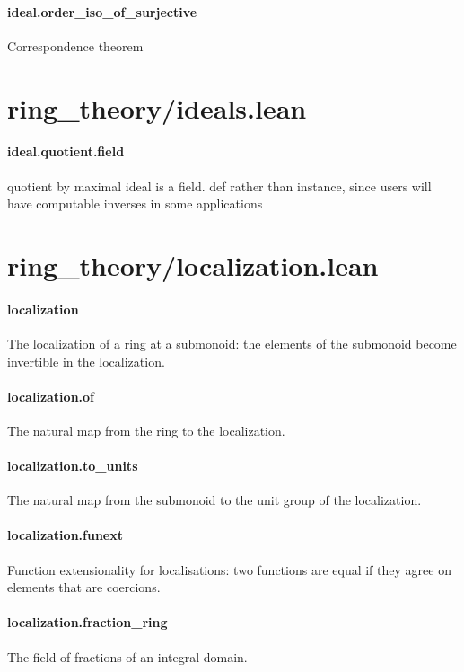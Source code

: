 \documentclass{article}
\begin{document}
\paragraph{ideal.order\_iso\_of\_surjective}
\par
Correspondence theorem
\section{ring\_theory/ideals.lean}\paragraph{ideal.quotient.field}
\par
quotient by maximal ideal is a field. def rather than instance, since users will have
computable inverses in some applications
\section{ring\_theory/localization.lean}\paragraph{localization}
\par
The localization of a ring at a submonoid:
the elements of the submonoid become invertible in the localization.
\paragraph{localization.of}
\par
The natural map from the ring to the localization.
\paragraph{localization.to\_units}
\par
The natural map from the submonoid to the unit group of the localization.
\paragraph{localization.funext}
\par
Function extensionality for localisations:
two functions are equal if they agree on elements that are coercions.
\paragraph{localization.fraction\_ring}
\par
The field of fractions of an integral domain.
\end{document}
